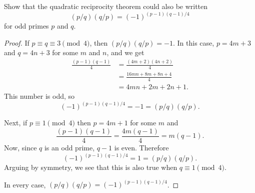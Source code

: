  Show that the quadratic reciprocity theorem could also be
written
\begin{equation*}
  (p/q)(q/p) = (-1)^{(p-1)(q-1)/4}
\end{equation*}
for odd primes $p$ and $q$.
\begin{proof}
  If $p\equiv q\equiv3\pmod4$, then $(p/q)(q/p) = -1$. In this case,
  $p = 4m + 3$ and $q = 4n + 3$ for some $m$ and $n$, and we get
  \begin{align*}
    \frac{(p-1)(q-1)}4
    &= \frac{(4m + 2)(4n + 2)}4 \\
    &= \frac{16mn + 8m + 8n + 4}4 \\
    &= 4mn + 2m + 2n + 1.
  \end{align*}
  This number is odd, so
  \begin{equation*}
    (-1)^{(p-1)(q-1)/4} = -1 = (p/q)(q/p).
  \end{equation*}

  Next, if $p\equiv1\pmod4$ then $p = 4m + 1$ for some $m$ and
  \begin{equation*}
    \frac{(p-1)(q-1)}4 = \frac{4m(q-1)}4 = m(q-1).
  \end{equation*}
  Now, since $q$ is an odd prime, $q-1$ is even. Therefore
  \begin{equation*}
    (-1)^{(p-1)(q-1)/4} = 1 = (p/q)(q/p).
  \end{equation*}
  Arguing by symmetry, we see that this is also true when
  $q\equiv1\pmod4$.

  In every case, $(p/q)(q/p) = (-1)^{(p-1)(q-1)/4}$.
\end{proof}
